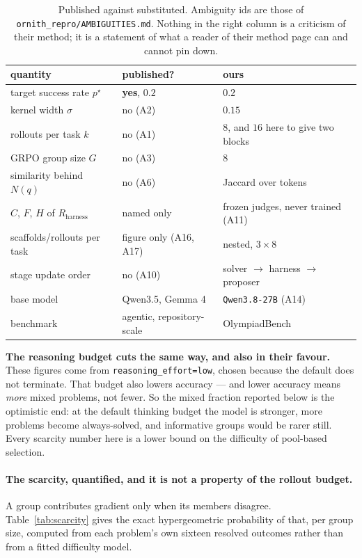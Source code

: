 \begin{table}[t]
\centering\small
\caption{Published against substituted. Ambiguity ids are those of
\texttt{ornith\_repro/AMBIGUITIES.md}. Nothing in the right column is a criticism of their
method; it is a statement of what a reader of their method page can and cannot pin down.}
\label{tab:theirsours}
\begin{tabular}{lll}
\toprule
quantity & published? & ours \\
\midrule
target success rate $p^\star$      & \textbf{yes}, $0.2$ & $0.2$ \\
kernel width $\sigma$              & no (A2)  & $0.15$ \\
rollouts per task $k$              & no (A1)  & $8$, and $16$ here to give two blocks \\
GRPO group size $G$                & no (A3)  & $8$ \\
similarity behind $N(q)$           & no (A6)  & Jaccard over tokens \\
$C$, $F$, $H$ of $R_{\mathrm{harness}}$ & named only & frozen judges, never trained (A11) \\
scaffolds/rollouts per task        & figure only (A16, A17) & nested, $3\times8$ \\
stage update order                 & no (A10) & solver $\to$ harness $\to$ proposer \\
base model                         & Qwen3.5, Gemma 4 & \texttt{Qwen3.8-27B} (A14) \\
benchmark                          & agentic, repository-scale & OlympiadBench \\
\bottomrule
\end{tabular}
\end{table}

\textbf{The reasoning budget cuts the same way, and also in their favour.} These figures come
from \texttt{reasoning\_effort=low}, chosen because the default does not terminate. That budget
also lowers accuracy --- and lower accuracy means \emph{more} mixed problems, not fewer. So the
mixed fraction reported below is the optimistic end: at the default thinking budget the model
is stronger, more problems become always-solved, and informative groups would be rarer still.
Every scarcity number here is a lower bound on the difficulty of pool-based selection.

\paragraph{The scarcity, quantified, and it is not a property of the rollout budget.} A group
contributes gradient only when its members disagree. Table~\ref{tab:scarcity} gives the exact
hypergeometric probability of that, per group size, computed from each problem's own sixteen
resolved outcomes rather than from a fitted difficulty model.

